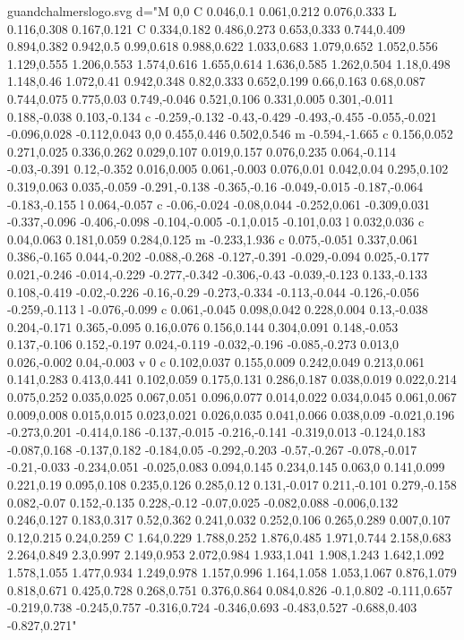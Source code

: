 \begin{filecontents}[noheader]{guandchalmerslogo.svg}
			   d="M 0,0 C 0.046,0.1 0.061,0.212 0.076,0.333 L 0.116,0.308 0.167,0.121 C 0.334,0.182 0.486,0.273 0.653,0.333 0.744,0.409 0.894,0.382 0.942,0.5 0.99,0.618 0.988,0.622 1.033,0.683 1.079,0.652 1.052,0.556 1.129,0.555 1.206,0.553 1.574,0.616 1.655,0.614 1.636,0.585 1.262,0.504 1.18,0.498 1.148,0.46 1.072,0.41 0.942,0.348 0.82,0.333 0.652,0.199 0.66,0.163 0.68,0.087 0.744,0.075 0.775,0.03 0.749,-0.046 0.521,0.106 0.331,0.005 0.301,-0.011 0.188,-0.038 0.103,-0.134 c -0.259,-0.132 -0.43,-0.429 -0.493,-0.455 -0.055,-0.021 -0.096,0.028 -0.112,0.043 0,0 0.455,0.446 0.502,0.546 m -0.594,-1.665 c 0.156,0.052 0.271,0.025 0.336,0.262 0.029,0.107 0.019,0.157 0.076,0.235 0.064,-0.114 -0.03,-0.391 0.12,-0.352 0.016,0.005 0.061,-0.003 0.076,0.01 0.042,0.04 0.295,0.102 0.319,0.063 0.035,-0.059 -0.291,-0.138 -0.365,-0.16 -0.049,-0.015 -0.187,-0.064 -0.183,-0.155 l 0.064,-0.057 c -0.06,-0.024 -0.08,0.044 -0.252,0.061 -0.309,0.031 -0.337,-0.096 -0.406,-0.098 -0.104,-0.005 -0.1,0.015 -0.101,0.03 l 0.032,0.036 c 0.04,0.063 0.181,0.059 0.284,0.125 m -0.233,1.936 c 0.075,-0.051 0.337,0.061 0.386,-0.165 0.044,-0.202 -0.088,-0.268 -0.127,-0.391 -0.029,-0.094 0.025,-0.177 0.021,-0.246 -0.014,-0.229 -0.277,-0.342 -0.306,-0.43 -0.039,-0.123 0.133,-0.133 0.108,-0.419 -0.02,-0.226 -0.16,-0.29 -0.273,-0.334 -0.113,-0.044 -0.126,-0.056 -0.259,-0.113 l -0.076,-0.099 c 0.061,-0.045 0.098,0.042 0.228,0.004 0.13,-0.038 0.204,-0.171 0.365,-0.095 0.16,0.076 0.156,0.144 0.304,0.091 0.148,-0.053 0.137,-0.106 0.152,-0.197 0.024,-0.119 -0.032,-0.196 -0.085,-0.273 0.013,0 0.026,-0.002 0.04,-0.003 v 0 c 0.102,0.037 0.155,0.009 0.242,0.049 0.213,0.061 0.141,0.283 0.413,0.441 0.102,0.059 0.175,0.131 0.286,0.187 0.038,0.019 0.022,0.214 0.075,0.252 0.035,0.025 0.067,0.051 0.096,0.077 0.014,0.022 0.034,0.045 0.061,0.067 0.009,0.008 0.015,0.015 0.023,0.021 0.026,0.035 0.041,0.066 0.038,0.09 -0.021,0.196 -0.273,0.201 -0.414,0.186 -0.137,-0.015 -0.216,-0.141 -0.319,0.013 -0.124,0.183 -0.087,0.168 -0.137,0.182 -0.184,0.05 -0.292,-0.203 -0.57,-0.267 -0.078,-0.017 -0.21,-0.033 -0.234,0.051 -0.025,0.083 0.094,0.145 0.234,0.145 0.063,0 0.141,0.099 0.221,0.19 0.095,0.108 0.235,0.126 0.285,0.12 0.131,-0.017 0.211,-0.101 0.279,-0.158 0.082,-0.07 0.152,-0.135 0.228,-0.12 -0.07,0.025 -0.082,0.088 -0.006,0.132 0.246,0.127 0.183,0.317 0.52,0.362 0.241,0.032 0.252,0.106 0.265,0.289 0.007,0.107 0.12,0.215 0.24,0.259 C 1.64,0.229 1.788,0.252 1.876,0.485 1.971,0.744 2.158,0.683 2.264,0.849 2.3,0.997 2.149,0.953 2.072,0.984 1.933,1.041 1.908,1.243 1.642,1.092 1.578,1.055 1.477,0.934 1.249,0.978 1.157,0.996 1.164,1.058 1.053,1.067 0.876,1.079 0.818,0.671 0.425,0.728 0.268,0.751 0.376,0.864 0.084,0.826 -0.1,0.802 -0.111,0.657 -0.219,0.738 -0.245,0.757 -0.316,0.724 -0.346,0.693 -0.483,0.527 -0.688,0.403 -0.827,0.271"

\end{filecontents}
